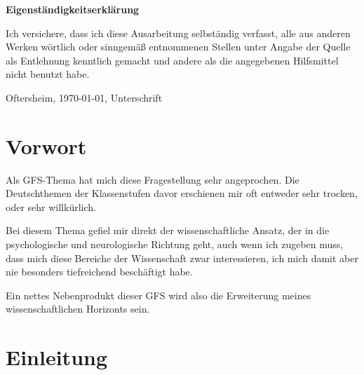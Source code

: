 \documentclass[12pt]{scrreprt}
\begin{document}
\makeititle
\begin{center}
	\sffamily\bfseries{Eigenständigkeitserklärung}
\end{center}
Ich versichere, dass ich diese Ausarbeitung selbständig verfasst, alle aus
anderen Werken wörtlich oder sinngemäß entnommenen Stellen unter Angabe der
Quelle als Entlehnung kenntlich gemacht und andere als die angegebenen
Hilfsmittel nicht benutzt habe.

Oftersheim, \today, Unterschrift
\tableofcontents
\listoffigures
\listoftables
\chapter{Vorwort}
	\label{chap:vorwort}
\bigskip\newline
Als GFS-Thema hat mich diese Fragestellung sehr angeprochen.
Die Deutschthemen der Klassenstufen davor erschienen mir oft entweder sehr
trocken, oder sehr willkürlich.

Bei diesem Thema gefiel mir direkt der wissenschaftliche Ansatz, der in die
psychologische und neurologische Richtung geht, auch wenn ich zugeben muss, dass
mich diese Bereiche der Wissenschaft zwar interessieren, ich mich damit aber nie
besonders tiefreichend beschäftigt habe.

Ein nettes Nebenprodukt dieser GFS wird also die Erweiterung meines
wissenschaftlichen Horizonts sein.

\chapter{Einleitung}
\label{chap:einleitung}
\end{document}

